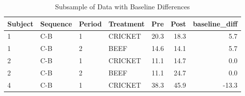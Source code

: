 \begin{Shaded}
\begin{Highlighting}[]
\OtherTok{\textless{}{-}}\SpecialCharTok{\%\textgreater{}\%}
  \NormalTok{(}\SpecialCharTok{{-}}\SpecialCharTok{\%\textgreater{}\%}
  \NormalTok{(}\StringTok{\textasciigrave{}}\StringTok{\textasciigrave{}} \OtherTok{=} \NormalTok{, }\StringTok{\textasciigrave{}}\StringTok{\textasciigrave{}} \OtherTok{=} \NormalTok{) }\SpecialCharTok{\%\textgreater{}\%}
  \NormalTok{(} \NormalTok{(}\StringTok{\textasciigrave{}}\StringTok{\textasciigrave{}}\NormalTok{,}\StringTok{\textasciigrave{}}\StringTok{\textasciigrave{}}\NormalTok{), } \NormalTok{, } \NormalTok{,}
               \SpecialCharTok{\%\textgreater{}\%}
  \SpecialCharTok{\%\textgreater{}\%} 
  \SpecialCharTok{==}\SpecialCharTok{==}\SpecialCharTok{\%\textgreater{}\%}
   \NormalTok{) }\SpecialCharTok{\%\textgreater{}\%}
   \NormalTok{)}
\end{Highlighting}
\end{Shaded}

\begin{table}

\caption{\label{tab:data-baseline-demo}Subsample of Data with Baseline Differences}
\centering
\begin{tabular}[t]{llllrrr}
\toprule
Subject & Sequence & Period & Treatment & Pre & Post & baseline\_diff\\
\midrule
1 & C-B & 1 & CRICKET & 20.3 & 18.3 & 5.7\\
1 & C-B & 2 & BEEF & 14.6 & 14.1 & 5.7\\
2 & C-B & 1 & CRICKET & 11.1 & 14.7 & 0.0\\
2 & C-B & 2 & BEEF & 11.1 & 24.7 & 0.0\\
4 & C-B & 1 & CRICKET & 38.3 & 45.9 & -13.3\\
\bottomrule
\end{tabular}
\end{table}

